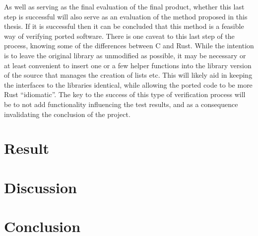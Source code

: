 \documentclass{article}
\begin{document}
As well as serving as the final evaluation of the final product, whether this last step is successful will also serve as an evaluation of the method proposed in this thesis. If it is successful then it can be concluded that this method is a feasible way of verifying ported software. There is one caveat to this last step of the process, knowing some of the differences between C and Rust. While the intention is to leave the original library as unmodified as possible, it may be necessary or at least convenient to insert one or a few helper functions into the library version of the source that manages the creation of lists etc. This will likely aid in keeping the interfaces to the libraries identical, while allowing the ported code to be more Rust “idiomatic”. The key to the success of this type of verification process will be to not add functionality influencing the test results, and as a consequence invalidating the conclusion of the project.

 
\section{Result}\label{result}



\section{Discussion}\label{discussion}


\section{Conclusion}\label{conclusion}
\end{document}
